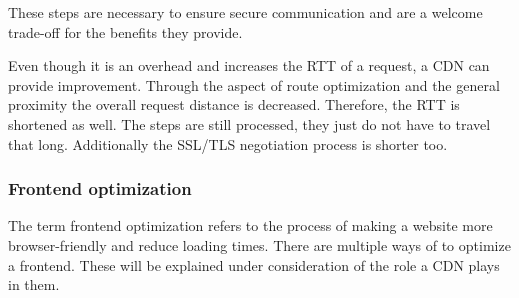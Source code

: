 These steps are necessary to ensure secure communication and are a welcome trade-off for the benefits they provide. 

Even though it is an overhead and increases the RTT of a request, a CDN can provide improvement. Through the aspect of route optimization and the general proximity the overall request distance is decreased. Therefore, the RTT is shortened as well. The steps are still processed, they just do not have to travel that long. Additionally the SSL/TLS negotiation process is shorter too.\cite{cdn_ssl_tsl}

\subsubsection{Frontend optimization}

The term frontend optimization refers to the process of making a website more browser-friendly and reduce loading times. There are multiple ways of to optimize a frontend. These will be explained under consideration of the role a CDN plays in them.

